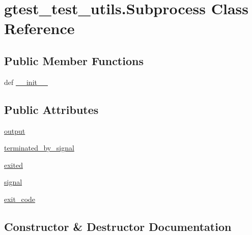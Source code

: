 \hypertarget{classgtest__test__utils_1_1_subprocess}{}\section{gtest\+\_\+test\+\_\+utils.\+Subprocess Class Reference}
\label{classgtest__test__utils_1_1_subprocess}
\subsection*{Public Member Functions}
\begin{DoxyCompactItemize}
\item 
def \hyperlink{classgtest__test__utils_1_1_subprocess_af9df76a6fe0bb7bbf4988c22bb79ed36}{\+\_\+\+\_\+init\+\_\+\+\_\+}
\end{DoxyCompactItemize}
\subsection*{Public Attributes}
\begin{DoxyCompactItemize}
\item 
\hyperlink{classgtest__test__utils_1_1_subprocess_a170f722b867e51f3e97b5b60399988cf}{output}
\item 
\hyperlink{classgtest__test__utils_1_1_subprocess_a9654b9eddd43c93acf66d5c7b0026fca}{terminated\+\_\+by\+\_\+signal}
\item 
\hyperlink{classgtest__test__utils_1_1_subprocess_a020b5fa8268b9eaf1c4a57cbd53c104d}{exited}
\item 
\hyperlink{classgtest__test__utils_1_1_subprocess_af083cd9621a5d5346ffe800191678ea3}{signal}
\item 
\hyperlink{classgtest__test__utils_1_1_subprocess_a01acee4476fd01ccf017d1351cf46c08}{exit\+\_\+code}
\end{DoxyCompactItemize}


\subsection{Constructor \& Destructor Documentation}
\hypertarget{classgtest__test__utils_1_1_subprocess_af9df76a6fe0bb7bbf4988c22bb79ed36}{}
